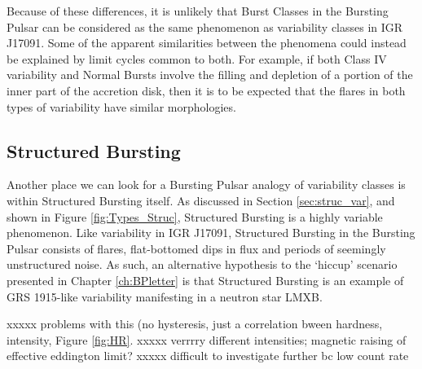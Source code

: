 Because of these differences, it is unlikely that Burst Classes in the Bursting Pulsar can be considered as the same phenomenon as variability classes in IGR J17091.  Some of the apparent similarities between the phenomena could instead be explained by limit cycles common to both.  For example, if both Class IV variability and Normal Bursts involve the filling and depletion of a portion of the inner part of the accretion disk, then it is to be expected that the flares in both types of variability have similar morphologies.

\subsection{Structured Bursting}

\par Another place we can look for a Bursting Pulsar analogy of variability classes is within Structured Bursting itself.  As discussed in Section \ref{sec:struc_var}, and shown in Figure \ref{fig:Types_Struc}, Structured Bursting is a highly variable phenomenon.  Like variability in IGR J17091, Structured Bursting in the Bursting Pulsar consists of flares, flat-bottomed dips in flux and periods of seemingly unstructured noise.  As such, an alternative hypothesis to the `hiccup' scenario presented in Chapter \ref{ch:BPletter} is that Structured Bursting is an example of GRS 1915-like variability manifesting in a neutron star LMXB.
\par xxxxx problems with this (no hysteresis, just a correlation bween hardness, intensity, Figure \ref{fig:HR}.  xxxxx verrrry different intensities; magnetic raising of effective eddington limit?  xxxxx difficult to investigate further bc low count rate